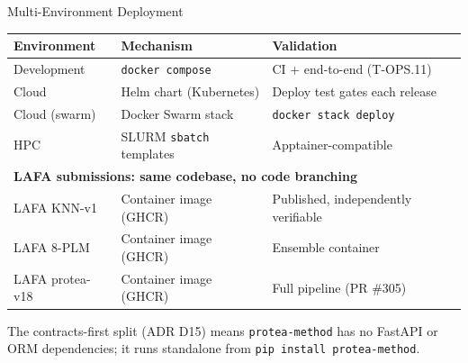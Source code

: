\documentclass[12pt, aspectratio=169]{beamer}
\begin{document}
\begin{frame}{Multi-Environment Deployment}
  \begin{center}
    \begin{tabular}{lll}
      \toprule
      \textbf{Environment} & \textbf{Mechanism} & \textbf{Validation} \\
      \midrule
      Development   & \texttt{docker compose} & CI + end-to-end (T-OPS.11) \\
      Cloud         & Helm chart (Kubernetes)  & Deploy test gates each release \\
      Cloud (swarm) & Docker Swarm stack       & \texttt{docker stack deploy} \\
      HPC           & SLURM \texttt{sbatch} templates & Apptainer-compatible \\
      \midrule
      \multicolumn{3}{l}{\textbf{LAFA submissions: same codebase, no code branching}} \\
      \midrule
      LAFA KNN-v1   & Container image (GHCR)   & Published, independently verifiable \\
      LAFA 8-PLM    & Container image (GHCR)   & Ensemble container \\
      LAFA protea-v18 & Container image (GHCR) & Full pipeline (PR \#305) \\
      \bottomrule
    \end{tabular}
  \end{center}
  \vspace{0.5em}
  {\small The contracts-first split (ADR D15) means \texttt{protea-method} has no FastAPI or ORM dependencies; it runs standalone from \texttt{pip install protea-method}.}
\end{frame}

\end{document}
